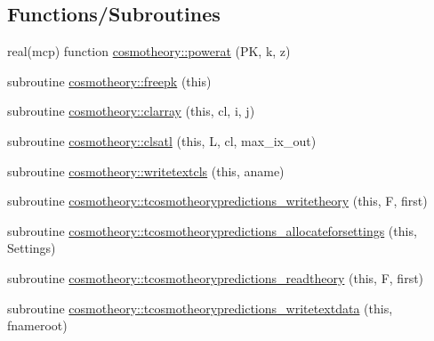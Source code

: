 \subsection*{Functions/\+Subroutines}
\begin{DoxyCompactItemize}
\item 
real(mcp) function \mbox{\hyperlink{namespacecosmotheory_a6c9071e7ff33914f7d9957dcf8790938}{cosmotheory\+::powerat}} (PK, k, z)
\item 
subroutine \mbox{\hyperlink{namespacecosmotheory_a9f04a404c1ca817b4a8ff9046f85bea6}{cosmotheory\+::freepk}} (this)
\item 
subroutine \mbox{\hyperlink{namespacecosmotheory_a605ce5a8433255f2dffd34cc83381994}{cosmotheory\+::clarray}} (this, cl, i, j)
\item 
subroutine \mbox{\hyperlink{namespacecosmotheory_a98c26fbec9089b69336f49452bf55c94}{cosmotheory\+::clsatl}} (this, L, cl, max\+\_\+ix\+\_\+out)
\item 
subroutine \mbox{\hyperlink{namespacecosmotheory_aa5b006674819db6a4859e0e709fbd275}{cosmotheory\+::writetextcls}} (this, aname)
\item 
subroutine \mbox{\hyperlink{namespacecosmotheory_a4ff659fbb6df4ea03d45ef993ec6dd32}{cosmotheory\+::tcosmotheorypredictions\+\_\+writetheory}} (this, F, first)
\item 
subroutine \mbox{\hyperlink{namespacecosmotheory_a6d0d95c32ef1d72829beee8c549606d9}{cosmotheory\+::tcosmotheorypredictions\+\_\+allocateforsettings}} (this, Settings)
\item 
subroutine \mbox{\hyperlink{namespacecosmotheory_aef1a661d37d1e130bced884acc9ea1bd}{cosmotheory\+::tcosmotheorypredictions\+\_\+readtheory}} (this, F, first)
\item 
subroutine \mbox{\hyperlink{namespacecosmotheory_a10b74bbd756437c4b81eb4130afae354}{cosmotheory\+::tcosmotheorypredictions\+\_\+writetextdata}} (this, fnameroot)
\end{DoxyCompactItemize}
